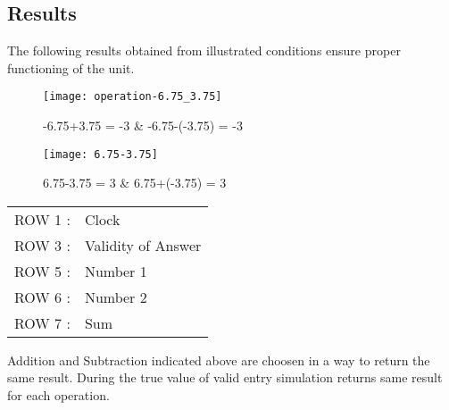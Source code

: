 \documentclass[11pt]{article}
\begin{document}
    \subsection{Results}
    The following results obtained from illustrated conditions ensure proper functioning of the unit.
    \begin{figure}[h]
        \begin{minipage}{.45\textwidth}
            \begin{center}
                \texttt{[image: operation-6.75\_3.75]}
                \caption*{-6.75+3.75 = -3 \& -6.75-(-3.75) = -3}
            \end{center}
        \end{minipage}
        \begin{minipage}{.45\textwidth}
            \begin{center}
                \texttt{[image: 6.75-3.75]}
                \caption*{6.75-3.75 = 3 \& 6.75+(-3.75) = 3}
            \end{center}
        \end{minipage}
    \end{figure}
    \newline
    \begin{tabular}{l l}
        ROW 1 : & Clock              \\
        ROW 3 : & Validity of Answer \\
        ROW 5 : & Number 1           \\
        ROW 6 : & Number 2           \\
        ROW 7 : & Sum
    \end{tabular}
    \vspace{.2cm}
    \newline
    Addition and Subtraction indicated above are choosen in a way to return the same result. During the true value of valid entry simulation returns same result for each operation.
    \newpage
\end{document}
